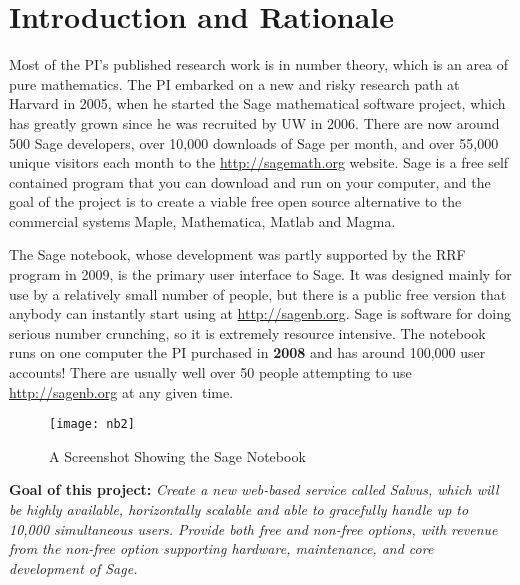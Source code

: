 \documentclass[11pt]{article}
\begin{document}
\section{Introduction and Rationale}


Most of the PI's published research work is in
number theory, which is an area of pure mathematics.  The PI embarked
on a new and risky research path at Harvard in 2005, when he started
the Sage mathematical software project, which has greatly grown since
he was recruited by UW in 2006.  There are now around 500 Sage
developers, over 10,000 downloads of Sage per month, and over 55,000
unique visitors each month to the \url{http://sagemath.org} website.
Sage is a free self contained program that you can download and run on
your computer, and the goal of the project is to create a viable free
open source alternative to the commercial systems Maple, Mathematica,
Matlab and Magma.

The Sage notebook, whose development was partly supported by the RRF
program in 2009, is the primary user interface to Sage.  It was
designed mainly for use by a relatively small number of people, but
there is a public free version that anybody can instantly start using
at \url{http://sagenb.org}.  Sage is software for doing serious number
crunching, so it is extremely resource intensive.  The notebook runs
on one computer the PI purchased in {\bf 2008} and has around 100,000
user accounts!  There are usually well over 50 people attempting to
use \url{http://sagenb.org} at any given time.

\begin{figure}[ht]
\begin{center}
\texttt{[image: nb2]}
\caption{A Screenshot Showing the Sage Notebook\label{fig:sagenb}}
\end{center}
\end{figure}

{\bf Goal of this project:} {\em Create a new web-based service called
  Salvus, which will be highly available, horizontally scalable and
  able to gracefully handle up to 10,000 simultaneous users.  Provide
  both free and non-free options, with revenue from the non-free
  option supporting hardware, maintenance, and core development of
  Sage.}
\end{document}
